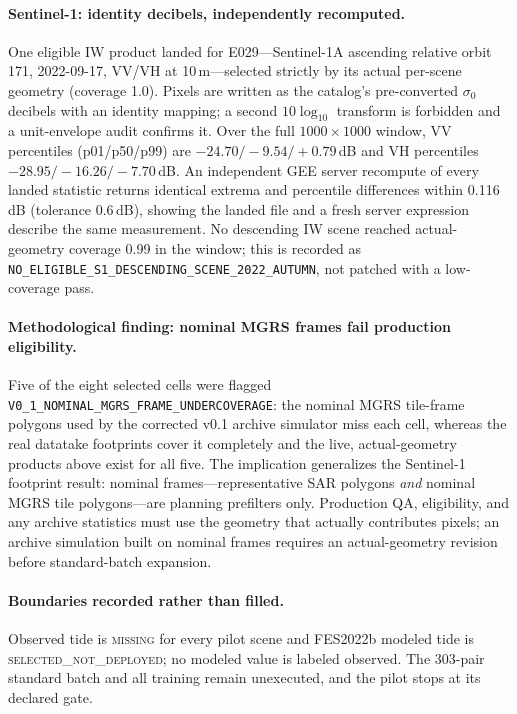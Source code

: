 \paragraph{Sentinel-1: identity decibels, independently recomputed.}
One eligible IW product landed for E029---Sentinel-1A ascending
relative orbit 171, 2022-09-17, VV/VH at 10\,m---selected strictly by
its actual per-scene geometry (coverage 1.0). Pixels are written as
the catalog's pre-converted $\sigma_0$ decibels with an identity
mapping; a second $10\log_{10}$ transform is forbidden and a
unit-envelope audit confirms it. Over the full $1000\times1000$
window, VV percentiles (p01/p50/p99) are $-24.70/-9.54/+0.79$\,dB and
VH percentiles $-28.95/-16.26/-7.70$\,dB. An independent GEE server
recompute of every landed statistic returns identical extrema and
percentile differences within 0.116\,dB (tolerance 0.6\,dB), showing
the landed file and a fresh server expression describe the same
measurement. No descending IW scene reached actual-geometry coverage
0.99 in the window; this is recorded as
\texttt{NO\_ELIGIBLE\_S1\_DESCENDING\_SCENE\_2022\_AUTUMN}, not patched
with a low-coverage pass.

\paragraph{Methodological finding: nominal MGRS frames fail production
eligibility.} Five of the eight selected cells were flagged
\texttt{V0\_1\_NOMINAL\_MGRS\_FRAME\_UNDERCOVERAGE}: the nominal MGRS
tile-frame polygons used by the corrected v0.1 archive simulator miss
each cell, whereas the real datatake footprints cover it completely and
the live, actual-geometry products above exist for all five. The
implication generalizes the Sentinel-1 footprint result: nominal
frames---representative SAR polygons \emph{and} nominal MGRS tile
polygons---are planning prefilters only. Production QA, eligibility,
and any archive statistics must use the geometry that actually
contributes pixels; an archive simulation built on nominal frames
requires an actual-geometry revision before standard-batch expansion.

\paragraph{Boundaries recorded rather than filled.} Observed tide is
\textsc{missing} for every pilot scene and FES2022b modeled tide is
\textsc{selected\_not\_deployed}; no modeled value is labeled
observed. The 303-pair standard batch and all training remain
unexecuted, and the pilot stops at its declared gate.

